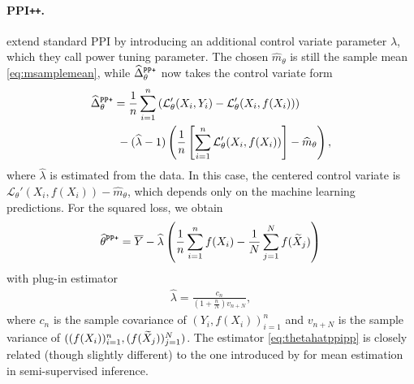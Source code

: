 \paragraph{PPI\texttt{++}.}
\citet{Angelopoulos2023a} extend standard PPI by introducing an additional control variate parameter $\lambda$, which they call power tuning parameter.
The chosen $\widehat m_\theta$ is still the sample mean \eqref{eq:msamplemean},
while $\widehat \Delta^{\mathrm{\texttt{PP+}}}_\theta$ now takes the control variate form
\begingroup
    \allowdisplaybreaks
    \begin{align}
        \widehat \Delta^{\mathrm{\texttt{PP+}}}_\theta&=\frac{1}{n}\sum_{i=1}^n \left(\mathcal{L}_{\theta}'(X_i,Y_i)-\mathcal{L}_{\theta}'(X_i,f(X_i))\right) \label{eq:deltahatpowertuning} \\
        & ~ - (\widehat \lambda -1 )\left( \frac{1}{n}\left [\sum_{i=1}^n \mathcal{L}_{\theta}'(X_i,f(X_i))\right ]  -\widehat m_\theta\right), \nonumber
    \end{align}
\endgroup
where $\widehat\lambda$ is estimated from the data.
In this case, the centered control variate is $\mathcal{L}_{\theta}'(X_i,f(X_i))-\widehat m_\theta$, which depends only on the machine learning predictions. For the squared loss, we obtain
\begin{align}
    \widehat\theta^{\mathrm{\texttt{PP+}}} = \overline Y - \widehat\lambda\left( \frac{1}{n}\sum_{i=1}^n f(X_i) - \frac{1}{N}\sum_{j=1}^{N} f(\widetilde X_j)     \right)
    \label{eq:thetahatppipp}
    \end{align}
with plug-in estimator
\begin{align}
    \widehat\lambda = \frac{c_n}{(1+\frac{n}{N})v_{n+N}}, \label{eq:lambdahat}
\end{align}
where $c_n$ is the sample covariance of $(Y_i,f(X_i))_{i=1}^n$ and $v_{n+N}$ is the sample variance of $((f(X_i))_{i=1}^n,(f(\widetilde X_j))_{j=1}^N)$. The estimator \eqref{eq:thetahatppipp} is closely related (though slightly different) to the one introduced by \citet{Zhang2019} for mean estimation in semi-supervised inference.

